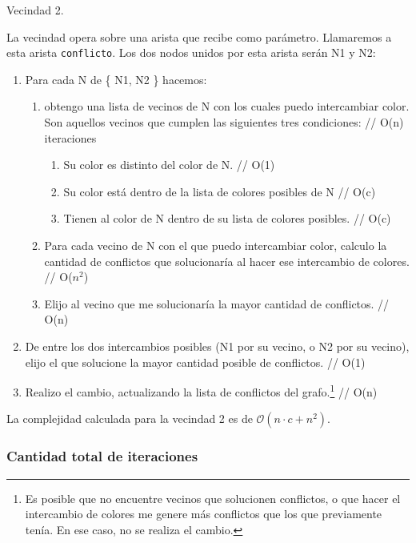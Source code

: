 \begin{algorithm}[H]
\caption{Vecindad 2.}
\label{vecindad2 pseudocode}
La vecindad opera sobre una arista que recibe como parámetro. Llamaremos a esta arista \texttt{conflicto}. Los dos nodos unidos por esta arista serán N1 y N2:
\begin{enumerate}
 \item Para cada N de \{ N1, N2 \} hacemos:
 \begin{enumerate}
   \item obtengo una lista de vecinos de N con los cuales puedo intercambiar color. Son aquellos vecinos que cumplen las siguientes tres condiciones:	// O(n) iteraciones
   \begin{enumerate}
    \item Su color es distinto del color de N.			// O(1)
    \item Su color está dentro de la lista de colores posibles de N	// O(c)
    \item Tienen al color de N dentro de su lista de colores posibles.	// O(c)
   \end{enumerate}
   \item Para cada vecino de N con el que puedo intercambiar color, calculo la cantidad de conflictos que solucionaría al hacer ese intercambio de colores. // O($n^2$)
   \item Elijo al vecino que me solucionaría la mayor cantidad de conflictos. // O(n)
 \end{enumerate}
 \item De entre los dos intercambios posibles (N1 por su vecino, o N2 por su vecino), elijo el que solucione la mayor cantidad posible de conflictos. // O(1)
 \item Realizo el cambio, actualizando la lista de conflictos del grafo.\footnote{Es posible que no encuentre vecinos que solucionen conflictos, o que hacer el intercambio de colores me genere más conflictos que los que previamente tenía. En ese caso, no se realiza el cambio.} // O(n)
 
\end{enumerate}
\end{algorithm}

La complejidad calculada para la vecindad 2 es de $\mathcal{O}(n \cdot c + n^2)$.

\subsubsection{Cantidad total de iteraciones}

